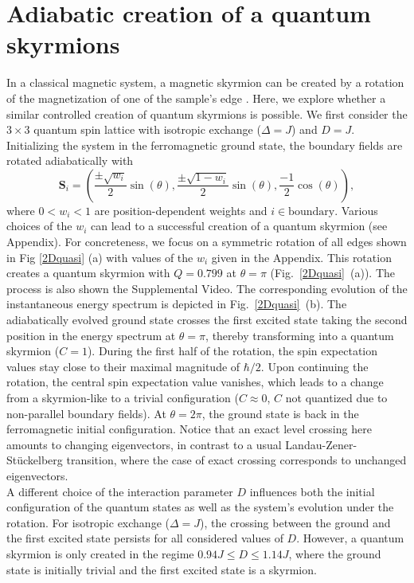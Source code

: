 \documentclass[reprint,aps,prb,superscriptaddress,10pt]{revtex4-2} %
\begin{document}
\section{Adiabatic creation of a quantum skyrmions}\label{SecAdiabaticCreation}
In a classical magnetic system, a magnetic skyrmion can be created by a rotation of the magnetization of one of the sample's edge \cite{Schaffer2020}. Here, we explore whether a similar controlled creation of quantum skyrmions is possible.
We first consider the $3\times3$ quantum spin lattice with isotropic exchange ($\Delta=J$) and $D=J$. Initializing the system in the ferromagnetic ground state, the boundary fields are rotated adiabatically with
\begin{equation}\label{AdiabRot}
\textbf{S}_{i}=\left(\frac{\pm\sqrt{w_{i}}}{2}\sin(\theta),\frac{\pm\sqrt{1-w_{i}}}{2}\sin(\theta),\frac{-1}{2}\cos(\theta)\right),
\end{equation}
where $0<w_{i}<1$ are position-dependent weights and $i\in\text{boundary}$. Various choices of the $w_i$ can lead to a successful creation of a quantum skyrmion (see Appendix). For concreteness, we focus on a symmetric rotation of all edges shown in Fig \ref{2Dquasi} (a) with values of the $w_i$ given in the Appendix.
This rotation creates a quantum skyrmion with $Q=0.799$ at $\theta=\pi$ (Fig.~\ref{2Dquasi}~(a)). The process is also shown the Supplemental Video. %
The corresponding evolution of the instantaneous energy spectrum is depicted in Fig.~\ref{2Dquasi}~(b). 
The adiabatically evolved ground state crosses the first excited state taking the second position in the energy spectrum at $\theta=\pi$, thereby transforming into a quantum skyrmion ($C=1$). During the first half of the rotation, the spin expectation values stay close to their maximal magnitude of $\hbar/2$. Upon continuing the rotation, the central spin expectation value vanishes, which leads to a change from a skyrmion-like to a trivial configuration ($C\approx0$, $C$ not quantized due to non-parallel boundary fields).  
At $\theta=2\pi$, the ground state is back in the ferromagnetic initial configuration.
Notice that an exact level crossing here amounts to  changing eigenvectors, in contrast to a usual Landau-Zener-Stückelberg transition, where the case of exact crossing corresponds to unchanged eigenvectors.
\\
A different choice of the interaction parameter $D$ influences both the initial configuration of the quantum states as well as the system's evolution under the rotation.
For isotropic exchange ($\Delta=J$), the crossing between the ground and the first excited state persists for all considered values of $D$. However, a quantum skyrmion is only created in the regime  $0.94J\leq D \leq 1.14J $, where the ground state is initially trivial and the first excited state is a skyrmion. 
\end{document}
